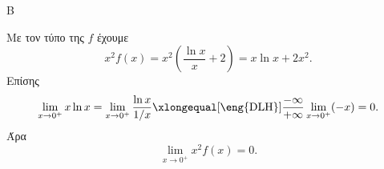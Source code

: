 \begin{thema}{Β}
\begin{erwthma}
\item Με τον τύπο της $f$ έχουμε
\[
x^2f(x)=x^2\left(\frac{\ln x}{x}+2\right)=x\ln x+2x^2.
\]
Επίσης
\[
\lim_{x\to0^+}x\ln x
=\lim_{x\to0^+}\frac{\ln x}{1/x}
\xlongequal[\text{\eng{DLH}}]{\frac{-\infty}{+\infty}}
\lim_{x\to0^+}(-x)=0.
\]
Άρα
\[
\lim_{x\to0^+}x^2f(x)=0.
\]
\end{erwthma}
\end{thema}

